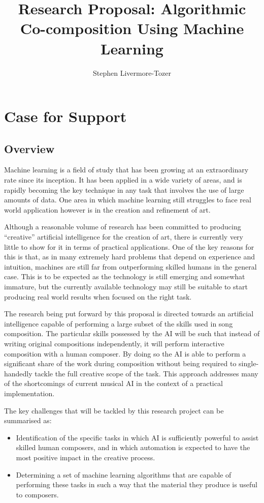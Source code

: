 \documentclass[11pt]{article}
\author{Stephen Livermore-Tozer}
\title{Research Proposal: Algorithmic Co-composition Using Machine Learning}
\begin{document}
	\maketitle
	
	\section{Case for Support}
	
	\subsection{Overview}
	
	Machine learning is a field of study that has been growing at an extraordinary rate since its inception. It has been applied in a wide variety of areas, and is rapidly becoming the key technique in any task that involves the use of large amounts of data. One area in which machine learning still struggles to face real world application however is in the creation and refinement of art.
	
	Although a reasonable volume of research has been committed to producing ``creative'' artificial intelligence for the creation of art, there is currently very little to show for it in terms of practical applications. One of the key reasons for this is that, as in many extremely hard problems that depend on experience and intuition, machines are still far from outperforming skilled humans in the general case. This is to be expected as the technology is still emerging and somewhat immature, but the currently available technology may still be suitable to start producing real world results when focused on the right task.
	
	The research being put forward by this proposal is directed towards an artificial intelligence capable of performing a large subset of the skills used in song composition. The particular skills possessed by the AI will be such that instead of writing original compositions independently, it will perform interactive composition with a human composer. By doing so the AI is able to perform a significant share of the work during composition without being required to single-handedly tackle the full creative scope of the task. This approach addresses many of the shortcomings of current musical AI in the context of a practical implementation. 
	
	The key challenges that will be tackled by this research project can be summarised as:
	
	\begin{itemize}
		\item Identification of the specific tasks in which AI is sufficiently powerful to assist skilled human composers, and in which automation is expected to have the most positive impact in the creative process.
		\item Determining a set of machine learning algorithms that are capable of performing these tasks in such a way that the material they produce is useful to composers.
	\end{itemize}
	
\end{document}
